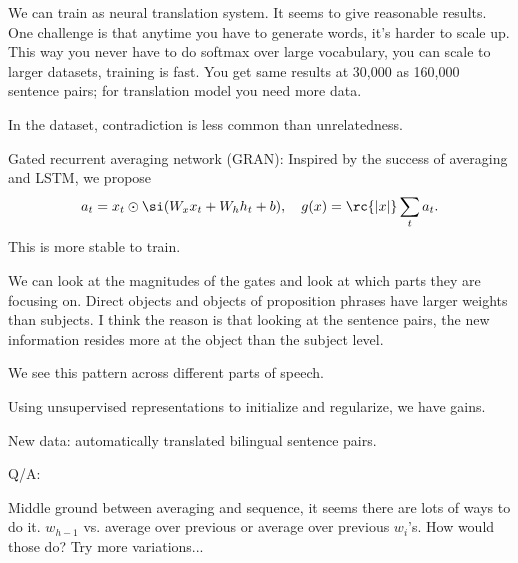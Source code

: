 
We can train as neural translation system. It seems to give reasonable results. One challenge is that anytime you have to generate words, it's harder to scale up. This way you never have to do softmax over large vocabulary, you can scale to larger datasets, training is fast. You get same results at 30,000 as 160,000 sentence pairs; for translation model you need more data.


In the dataset, contradiction is less common than unrelatedness.

Gated recurrent averaging network (GRAN): Inspired by the success of averaging and LSTM, we propose
$$
a_t = x_t \odot \si(W_xx_t + W_hh_t+b),\quad g(x) = \rc{|x|}\sum_t a_t.
$$
This is more stable to train. 

We can look at the magnitudes of the gates and look at which parts they are focusing on. %
Direct objects and objects of proposition phrases have larger weights than subjects. I think the reason is that looking at the sentence pairs, the new information resides more at the object than the subject level. 

We see this pattern across different parts of speech.

Using unsupervised representations to initialize and regularize, we have gains.

New data: automatically translated bilingual sentence pairs. 

Q/A:

Middle ground between averaging and sequence, it seems there are lots of ways to do it. $w_{h-1}$ vs. average over previous or average over previous $w_i$'s. How would those do? Try more variations...

